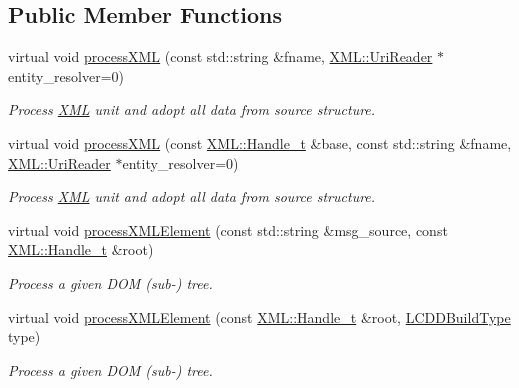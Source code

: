 \subsection*{Public Member Functions}
\begin{DoxyCompactItemize}
\item 
virtual void \hyperlink{class_d_d4hep_1_1_l_c_d_d_load_ad66ecd500f706896d32c5dbd050292bb}{processXML} (const std::string \&fname, \hyperlink{class_d_d4hep_1_1_x_m_l_1_1_uri_reader}{XML::UriReader} $\ast$entity\_\-resolver=0)
\begin{DoxyCompactList}\small\item\em Process \hyperlink{namespace_d_d4hep_1_1_x_m_l}{XML} unit and adopt all data from source structure. \item\end{DoxyCompactList}\item 
virtual void \hyperlink{class_d_d4hep_1_1_l_c_d_d_load_a667dcc51174452d11aa7868d768ec5d2}{processXML} (const \hyperlink{class_d_d4hep_1_1_x_m_l_1_1_handle__t}{XML::Handle\_\-t} \&base, const std::string \&fname, \hyperlink{class_d_d4hep_1_1_x_m_l_1_1_uri_reader}{XML::UriReader} $\ast$entity\_\-resolver=0)
\begin{DoxyCompactList}\small\item\em Process \hyperlink{namespace_d_d4hep_1_1_x_m_l}{XML} unit and adopt all data from source structure. \item\end{DoxyCompactList}\item 
virtual void \hyperlink{class_d_d4hep_1_1_l_c_d_d_load_a4f51d1a8f1e4c726371a0553d3478430}{processXMLElement} (const std::string \&msg\_\-source, const \hyperlink{class_d_d4hep_1_1_x_m_l_1_1_handle__t}{XML::Handle\_\-t} \&root)
\begin{DoxyCompactList}\small\item\em Process a given DOM (sub-\/) tree. \item\end{DoxyCompactList}\item 
virtual void \hyperlink{class_d_d4hep_1_1_l_c_d_d_load_a6273870262bd0bd4102b546c1ef9d04d}{processXMLElement} (const \hyperlink{class_d_d4hep_1_1_x_m_l_1_1_handle__t}{XML::Handle\_\-t} \&root, \hyperlink{namespace_d_d4hep_acafe43ba4537ab6e999e808142965fab}{LCDDBuildType} type)
\begin{DoxyCompactList}\small\item\em Process a given DOM (sub-\/) tree. \item\end{DoxyCompactList}\end{DoxyCompactItemize}
